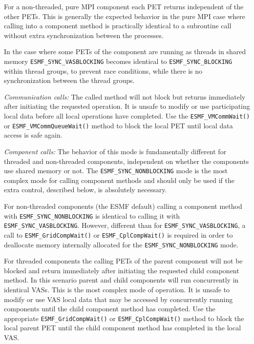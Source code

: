 \begin{description}
         For a non-threaded, pure MPI component each PET returns
         independent of the other PETs. This is generally the expected 
         behavior in the pure MPI case where calling into a component method is
         practically identical to a subroutine call without extra 
         synchronization between the processes.
         
\begin{sloppypar}
         In the case where some PETs of the component are running as
         threads in shared memory {\tt ESMF\_SYNC\_VASBLOCKING} becomes identical
         to {\tt ESMF\_SYNC\_BLOCKING} within thread groups, to prevent race
         conditions, while there is no synchronization between the thread
         groups.
\end{sloppypar}
         
\item [ESMF\_SYNC\_NONBLOCKING]
         {\em Communication calls:} The called method will not block but 
         returns immediately after initiating the requested operation. It is
         unsafe to modify or use participating local data before all local
         operations have completed. Use the {\tt ESMF\_VMCommWait()} or
         {\tt ESMF\_VMCommQueueWait()} method to block the local PET until
         local data access is safe again. 

         {\em Component calls:} The behavior of this mode is fundamentally
         different for threaded and non-threaded components,
         independent on whether the components use shared memory or not.
         The {\tt ESMF\_SYNC\_NONBLOCKING} mode is the most complex mode for
         calling component methods and should only be used if the extra
         control, described below, is absolutely necessary.
         
\begin{sloppypar}
         For non-threaded components (the ESMF default)
         calling a component method with {\tt ESMF\_SYNC\_NONBLOCKING}
         is identical to calling it with {\tt ESMF\_SYNC\_VASBLOCKING}. However,
         different than for {\tt ESMF\_SYNC\_VASBLOCKING}, a call to
         {\tt ESMF\_GridCompWait()} or {\tt ESMF\_CplCompWait()} is
         required in order to deallocate memory internally allocated for the
         {\tt ESMF\_SYNC\_NONBLOCKING} mode.
\end{sloppypar}
         
         For threaded components the calling PETs
         of the parent component will not be blocked and return immediately
         after initiating the requested child component method. In this
          scenario parent and child components will run concurrently in
         identical VASs. This is the most complex mode of operation.
         It is unsafe to modify or use VAS local data that
         may be accessed by concurrently running components until the child
         component method has completed. Use the appropriate
         {\tt ESMF\_GridCompWait()} or {\tt ESMF\_CplCompWait()} method to
         block the local parent PET until the child component method has
         completed in the local VAS.
\end{description}


